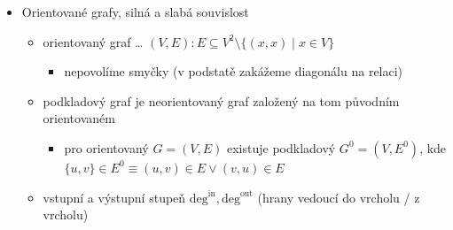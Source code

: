 \begin{itemize}
\begin{itemize}
\begin{itemize}
\end{itemize}
\item Mengerova věta, globální hranová verze
\begin{itemize}
\item graf $G$ je hranově $k$-souvislý $\iff$ mezi každými dvěma různými vrcholy existuje $k$ hranově disjunktních cest
\end{itemize}
\item definice: dvě cesty v $G$ z $x$ do $y$ jsou navzájem vnitřně vrcholově disjunktní (VVD), pokud nemají žádný společný vrchol kromě $x,y$
\item Mengerova věta, vrcholová $xy$-verze
\begin{itemize}
\item nechť $G=(V,E)$ je graf
\item nechť $x,y$ jsou různé \textbf{nesousední} vrcholy
\item nechť $k\in\mathbb N$
\item potom $G$ obsahuje $k$ navzájem VVD cest z $x$ do $y\iff G$ neobsahuje vrcholový $xy$-řez velikosti $\lt k$
\end{itemize}
\item Mengerova věta, globální vrcholová verze
\begin{itemize}
\item $G$ je vrcholově $k$-souvislý $\iff$ mezi každými dvěma různými vrcholy $x,y$ existuje $k$ navzájem VVD cest
\end{itemize}
\end{itemize}
\item Orientované grafy, silná a slabá souvislost
\begin{itemize}
\item orientovaný graf \dots{} $(V,E): E \subseteq V^2 \setminus \{(x,x)\mid x\in V\}$
\begin{itemize}
\item nepovolíme smyčky (v podstatě zakážeme diagonálu na relaci)
\end{itemize}
\item podkladový graf je neorientovaný graf založený na tom původním orientovaném
\begin{itemize}
\item pro orientovaný $G=(V,E)$ existuje podkladový $G^0=(V,E^0)$, kde $\lbrace u,v\rbrace \in E^0\equiv (u,v)\in E\lor (v,u)\in E$
\end{itemize}
\item vstupní a výstupní stupeň $\text{deg}^\text{in},\text{deg}^\text{out}$ (hrany vedoucí do vrcholu / z vrcholu)

\end{itemize}
\end{itemize}

